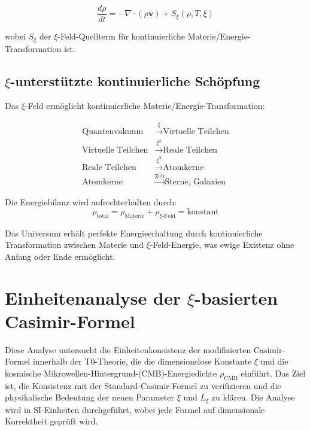 	\begin{equation}
		\frac{d\rho}{dt} = -\nabla \cdot (\rho \mathbf{v}) + S_\xi(\rho, T, \xi)
	\end{equation}
	
	wobei $S_\xi$ der $\xi$-Feld-Quellterm für kontinuierliche Materie/Energie-Transformation ist.
	
	\subsection{$\xi$-unterstützte kontinuierliche Schöpfung}
	
	Das $\xi$-Feld ermöglicht kontinuierliche Materie/Energie-Transformation:
	
	\begin{align}
		\text{Quantenvakuum} &\xrightarrow{\xi} \text{Virtuelle Teilchen} \\
		\text{Virtuelle Teilchen} &\xrightarrow{\xi^2} \text{Reale Teilchen} \\
		\text{Reale Teilchen} &\xrightarrow{\xi^3} \text{Atomkerne} \\
		\text{Atomkerne} &\xrightarrow{\text{Zeit}} \text{Sterne, Galaxien}
	\end{align}
	
	Die Energiebilanz wird aufrechterhalten durch:
	\begin{equation}
		\rho_{\text{total}} = \rho_{\text{Materie}} + \rho_{\xi\text{-Feld}} = \text{konstant}
	\end{equation}
	
	\begin{important}
		Das Universum erhält perfekte Energieerhaltung durch kontinuierliche Transformation zwischen Materie und $\xi$-Feld-Energie, was ewige Existenz ohne Anfang oder Ende ermöglicht.
	\end{important}
	
	\section{Einheitenanalyse der $\xi$-basierten Casimir-Formel}
	
	Diese Analyse untersucht die Einheitenkonsistenz der modifizierten Casimir-Formel innerhalb der T0-Theorie, die die dimensionslose Konstante $\xi$ und die kosmische Mikrowellen-Hintergrund-(CMB)-Energiedichte $\rho_{\text{CMB}}$ einführt. Das Ziel ist, die Konsistenz mit der Standard-Casimir-Formel zu verifizieren und die physikalische Bedeutung der neuen Parameter $\xi$ und $L_\xi$ zu klären. Die Analyse wird in SI-Einheiten durchgeführt, wobei jede Formel auf dimensionale Korrektheit geprüft wird.
	
